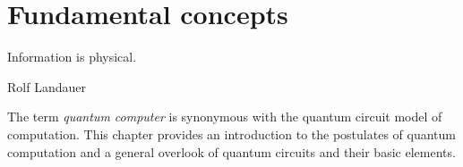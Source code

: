 \chapter{Fundamental concepts}\label{chap:1}
\epigraph{Information is physical.}{Rolf Landauer}
The term \emph{quantum computer} is synonymous with the quantum circuit model of computation. This chapter provides an introduction to the postulates of quantum computation and a general overlook of quantum circuits and their basic elements.



